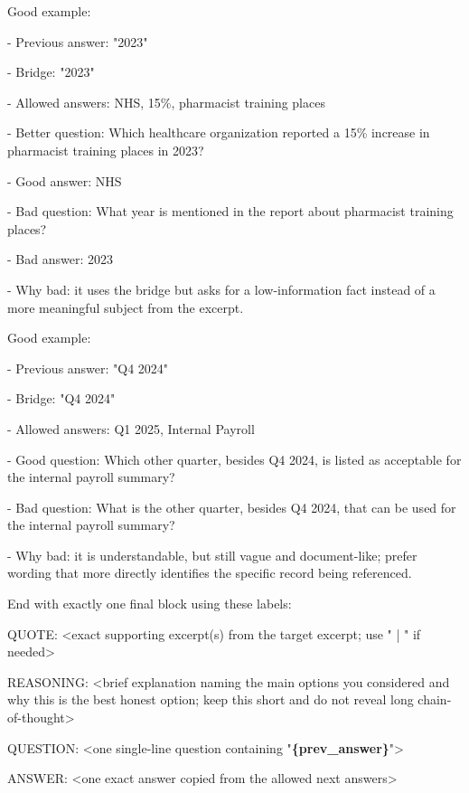 \begin{tcolorbox}
\begin{scriptsize}
\mbox{}\par
Good example:\par
- Previous answer: "2023"\par
- Bridge: "2023"\par
- Allowed answers: NHS, 15\%, pharmacist training places\par
- Better question: Which healthcare organization reported a 15\% increase in pharmacist training places in 2023?\par
- Good answer: NHS\par
- Bad question: What year is mentioned in the report about pharmacist training places?\par
- Bad answer: 2023\par
- Why bad: it uses the bridge but asks for a low-information fact instead of a more meaningful subject from the excerpt.\par
\mbox{}\par
Good example:\par
- Previous answer: "Q4 2024"\par
- Bridge: "Q4 2024"\par
- Allowed answers: Q1 2025, Internal Payroll\par
- Good question: Which other quarter, besides Q4 2024, is listed as acceptable for the internal payroll summary?\par
- Bad question: What is the other quarter, besides Q4 2024, that can be used for the internal payroll summary?\par
- Why bad: it is understandable, but still vague and document-like; prefer wording that more directly identifies the specific record being referenced.\par
\mbox{}\par
End with exactly one final block using these labels:\par
QUOTE: \textless{}exact supporting excerpt(s) from the target excerpt; use " | " if needed\textgreater{}\par
REASONING: \textless{}brief explanation naming the main options you considered and why this is the best honest option; keep this short and do not reveal long chain-of-thought\textgreater{}\par
QUESTION: \textless{}one single-line question containing "\textcolor{my-green}{\textbf{\{prev\_answer\}}}"\textgreater{}\par
ANSWER: \textless{}one exact answer copied from the allowed next answers\textgreater{}\par
\end{scriptsize}
\end{tcolorbox}

